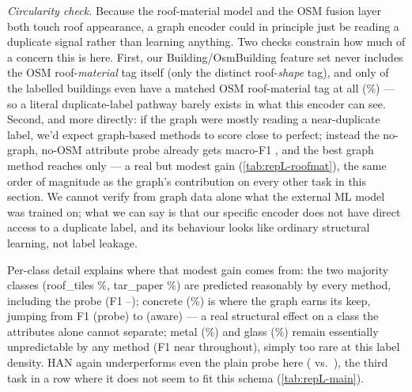 \emph{Circularity check.} Because the roof-material model and the OSM fusion
layer both touch roof appearance, a graph encoder could in principle just be
reading a duplicate signal rather than learning anything. Two checks
constrain how much of a concern this is here. First, our Building/OsmBuilding
feature set never includes the OSM roof-\emph{material} tag itself (only the
distinct roof-\emph{shape} tag), and only  of the
 labelled buildings even have a matched OSM roof-material tag
at all (\%) --- so a literal duplicate-label pathway barely exists in
what this encoder can see. Second, and more directly: if the graph were
mostly reading a near-duplicate label, we'd expect graph-based methods to
score close to perfect; instead the no-graph, no-OSM attribute probe already
gets macro-F1 , and the best graph method reaches only 
--- a real but modest  gain (\cref{tab:repL-roofmat}), the same
order of magnitude as the graph's contribution on every other task in this
section. We cannot verify from graph data alone what the external ML model
was trained on; what we can say is that our specific encoder does not have
direct access to a duplicate label, and its behaviour looks like ordinary
structural learning, not label leakage.

Per-class detail explains where that modest gain comes from: the two
majority classes (roof\_tiles \%, tar\_paper \%) are
predicted reasonably by every method, including the probe (F1
--); concrete (\%) is where the graph earns its
keep, jumping from F1  (probe) to  (aware) --- a real
structural effect on a class the attributes alone cannot separate; metal
(\%) and glass (\%) remain essentially unpredictable by any
method (F1 near  throughout), simply too rare at this label density.
HAN again underperforms even the plain probe here ( vs.\
), the third task in a row where it does not seem to fit this
schema (\cref{tab:repL-main}).

